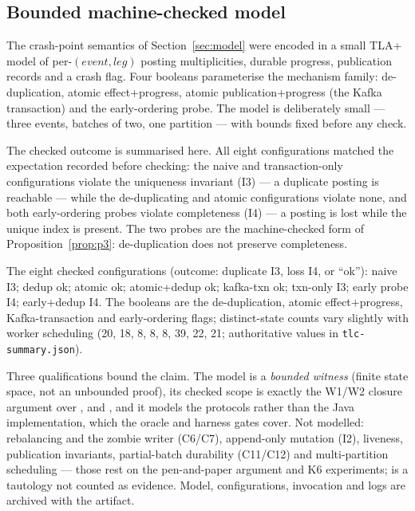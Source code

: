 \subsection{Bounded machine-checked model}
\label{sec:formal:tlc}

The crash-point semantics of Section~\ref{sec:model} were encoded in a small TLA+
\cite{lamport1994} model of per-$(\mathit{event},\mathit{leg})$ posting multiplicities, durable
progress, publication records and a crash flag. Four booleans parameterise the mechanism family:
de-duplication, atomic effect+progress, atomic publication+progress (the Kafka transaction) and
the early-ordering probe. The model is deliberately small --- three events, batches of two, one
partition --- with bounds fixed before any check.

The checked outcome is summarised here. All eight configurations matched the
expectation recorded before checking: the naive and transaction-only configurations violate the
uniqueness invariant (I3) --- a duplicate posting is reachable --- while the de-duplicating and
atomic configurations violate none, and both early-ordering probes violate completeness (I4) ---
a posting is lost while the unique index is present. The two probes are the machine-checked form
of Proposition~\ref{prop:p3}: de-duplication does not preserve completeness.


The eight checked configurations (outcome: duplicate I3, loss I4, or ``ok''): naive I3; dedup
ok; atomic ok; atomic+dedup ok; kafka-txn ok; txn-only I3; early probe I4; early+dedup I4. The
booleans are the de-duplication, atomic effect$+$progress, Kafka-transaction and early-ordering
flags; distinct-state counts vary slightly with worker scheduling (20, 18, 8, 8, 8, 39, 22, 21;
authoritative values in \texttt{tlc-summary.json}).

Three qualifications bound the claim. The model is a \emph{bounded witness} (finite state
space, not an unbounded proof), its checked scope is exactly the W1/W2 closure argument over
,  and , and it models the protocols
rather than the Java implementation, which the oracle and harness gates cover. Not modelled:
rebalancing and the zombie writer (C6/C7), append-only mutation (I2), liveness, publication
invariants, partial-batch durability (C11/C12) and multi-partition scheduling --- those rest on the
pen-and-paper argument and K6 experiments;  is a tautology not counted
as evidence. Model, configurations, invocation and logs are archived with the artifact.
